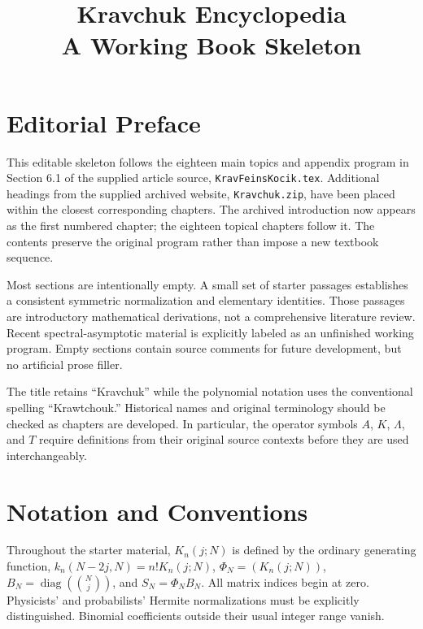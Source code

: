 \documentclass[11pt,oneside]{amsbook}
\title{Kravchuk Encyclopedia\\ A Working Book Skeleton}
\date{}
\theoremstyle{definition}
\theoremstyle{remark}
\begin{document}
\frontmatter
\maketitle
\chapter*{Editorial Preface}
This editable skeleton follows the eighteen main topics and appendix program in Section 6.1 of the supplied article source, \texttt{KravFeinsKocik.tex}. Additional headings from the supplied archived website, \texttt{Kravchuk.zip}, have been placed within the closest corresponding chapters. The archived introduction now appears as the first numbered chapter; the eighteen topical chapters follow it. The contents preserve the original program rather than impose a new textbook sequence.

Most sections are intentionally empty. A small set of starter passages establishes a consistent symmetric normalization and elementary identities. Those passages are introductory mathematical derivations, not a comprehensive literature review. Recent spectral-asymptotic material is explicitly labeled as an unfinished working program. Empty sections contain source comments for future development, but no artificial prose filler.

The title retains ``Kravchuk'' while the polynomial notation uses the conventional spelling ``Krawtchouk.'' Historical names and original terminology should be checked as chapters are developed. In particular, the operator symbols $A$, $K$, $\Lambda$, and $T$ require definitions from their original source contexts before they are used interchangeably.
\chapter*{Notation and Conventions}
Throughout the starter material, $K_n(j;N)$ is defined by the ordinary generating function, $k_n(N-2j,N)=n!K_n(j;N)$, $\Phi_N=(K_n(j;N))$, $B_N=\operatorname{diag}(\binom Nj)$, and $S_N=\Phi_NB_N$. All matrix indices begin at zero. Physicists' and probabilists' Hermite normalizations must be explicitly distinguished. Binomial coefficients outside their usual integer range vanish.
\tableofcontents
\mainmatter



















\appendix






\backmatter
\end{document}
